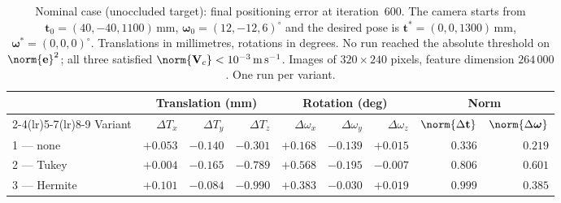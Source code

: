 \begin{table}[t]
    \centering
    \caption{Nominal case (unoccluded target): final positioning error at
    iteration~600. The camera starts from
    $\mathbf{t}_{0}=(40,-40,1100)\,\mathrm{mm}$,
    $\boldsymbol{\omega}_{0}=(12,-12,6)^{\circ}$ and the desired pose is
    $\mathbf{t}^{*}=(0,0,1300)\,\mathrm{mm}$,
    $\boldsymbol{\omega}^{*}=(0,0,0)^{\circ}$. Translations in millimetres,
    rotations in degrees. No run reached the absolute threshold on
    $\norm{\mathbf{e}}^{2}$; all three satisfied
    $\norm{\mathbf{V}_c}<10^{-3}\,\mathrm{m\,s^{-1}}$. Images of
    $320\times240$ pixels, feature dimension $264\,000$. One run per variant.}
    \label{tab:ch4-nominal}
    \small
    \begin{tabular}{@{}lrrrrrrrr@{}}
        \toprule
        & \multicolumn{3}{c}{Translation (mm)}
        & \multicolumn{3}{c}{Rotation (deg)}
        & \multicolumn{2}{c}{Norm} \\
        \cmidrule(lr){2-4}\cmidrule(lr){5-7}\cmidrule(lr){8-9}
        Variant & $\Delta T_x$ & $\Delta T_y$ & $\Delta T_z$
                & $\Delta\omega_x$ & $\Delta\omega_y$ & $\Delta\omega_z$
                & $\norm{\Delta\mathbf{t}}$ & $\norm{\Delta\boldsymbol{\omega}}$ \\
        \midrule
        1 --- none    & $+0.053$ & $-0.140$ & $-0.301$ & $+0.168$ & $-0.139$ & $+0.015$ & $0.336$ & $0.219$ \\
        2 --- Tukey   & $+0.004$ & $-0.165$ & $-0.789$ & $+0.568$ & $-0.195$ & $-0.007$ & $0.806$ & $0.601$ \\
        3 --- Hermite & $+0.101$ & $-0.084$ & $-0.990$ & $+0.383$ & $-0.030$ & $+0.019$ & $0.999$ & $0.385$ \\
        \bottomrule
    \end{tabular}
\end{table}



